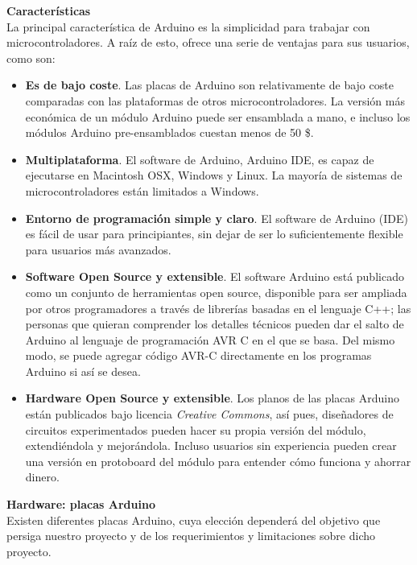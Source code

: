 \documentclass[12pt]{article}
\begin{document}
	\noindent \textbf{Características} \\
	
	\noindent La principal característica de Arduino es la simplicidad para trabajar con microcontroladores. A raíz de esto, ofrece una serie de ventajas para sus usuarios, como son:
	\begin{itemize}
		\item \textbf{Es de bajo coste}. Las placas de Arduino son relativamente de bajo coste comparadas con las plataformas de otros microcontroladores. La versión más económica de un módulo Arduino puede ser ensamblada a mano, e incluso los módulos Arduino pre-ensamblados cuestan menos de 50 \$.
		\item \textbf{Multiplataforma}. El software de Arduino, Arduino IDE, es capaz de ejecutarse en Macintosh OSX, Windows y Linux. La mayoría de sistemas de microcontroladores están limitados a Windows.
		\item  	\textbf{Entorno de programación simple y claro}. El software de Arduino (IDE) es fácil de usar para principiantes, sin dejar de ser lo suficientemente flexible para usuarios más avanzados.
		\item \textbf{Software Open Source y extensible}. El software Arduino está publicado como un conjunto de herramientas open source, disponible para ser ampliada por otros programadores a través de librerías basadas en el lenguaje C++; las personas que quieran comprender los detalles técnicos pueden dar el salto de Arduino al lenguaje de programación AVR C en el que se basa. Del mismo modo, se puede agregar código AVR-C directamente en los  programas Arduino si así se desea.
		\item \textbf{Hardware Open Source y extensible}. Los planos de las placas Arduino están publicados bajo licencia \textit{Creative Commons}, así pues, diseñadores de circuitos experimentados pueden hacer su propia versión del módulo, extendiéndola y mejorándola. Incluso usuarios sin experiencia pueden crear una versión en protoboard del módulo para entender cómo funciona y ahorrar dinero.
	
	\end{itemize}

	\noindent \textbf{Hardware: placas Arduino} \\
	
	\noindent Existen diferentes placas Arduino, cuya elección dependerá del objetivo que persiga nuestro proyecto y de los requerimientos y limitaciones sobre dicho proyecto. \\
	
\end{document}
